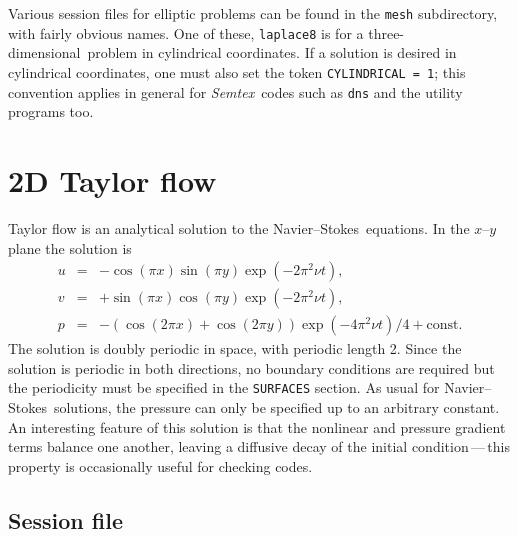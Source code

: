 \documentclass[11pt]{report}
\newcommand{\Semtex}{\emph{Semtex}} \newcommand{\Dog}{\emph{Dog}}
\newcommand\threed{three-di\-men\-sion\-al}
\newcommand\NavSto{Navier--Stokes}
\begin{document}
Various session files for elliptic problems can be found in the
\verb|mesh| subdirectory, with fairly obvious names. One of these,
\verb|laplace8| is for a \threed\ problem in cylindrical coordinates.
If a solution is desired in cylindrical coordinates, one must also set
the token \verb|CYLINDRICAL = 1|; this convention applies in general
for \Semtex\ codes such as \verb|dns| and the utility programs too.


\section{2D Taylor flow}
\label{sec.taylor}

Taylor flow is an analytical solution to the \NavSto\ equations.
In the $x$--$y$ plane the solution is 
\begin{eqnarray}
        u &=& -\cos(\pi x) \sin(\pi y) \exp(-2\pi^2\nu t),\\
        v &=& +\sin(\pi x) \cos(\pi y) \exp(-2\pi^2\nu t),\\
        p &=& -(\cos(2\pi x) + \cos(2\pi y)) \exp(-4\pi^2\nu t)/4
            + \textrm{const}.
\end{eqnarray}
The solution is doubly periodic in space, with periodic length 2.
Since the solution is periodic in both directions, no boundary
conditions are required but the periodicity must be specified in the
\verb|SURFACES| section.  As usual for \NavSto\ solutions, the
pressure can only be specified up to an arbitrary constant.  An
interesting feature of this solution is that the nonlinear and
pressure gradient terms balance one another, leaving a diffusive decay
of the initial condition\,---\,this property is occasionally useful for
checking codes.

\subsection{Session file}
\end{document}
